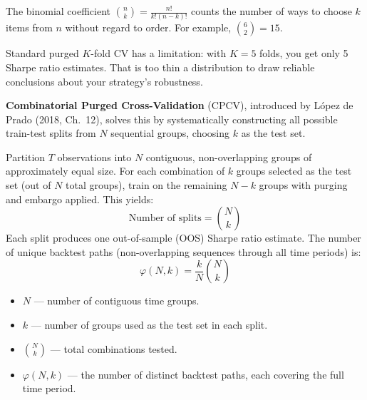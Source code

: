 \begin{prereq}
The binomial coefficient $\binom{n}{k} = \frac{n!}{k!(n-k)!}$ counts the number of ways to choose $k$ items from $n$ without regard to order. For example, $\binom{6}{2} = 15$.
\end{prereq}

Standard purged $K$-fold CV has a limitation: with $K = 5$ folds, you get only 5 Sharpe ratio estimates. That is too thin a distribution to draw reliable conclusions about your strategy's robustness.

\textbf{Combinatorial Purged Cross-Validation} (CPCV), introduced by L\'{o}pez de Prado (2018, Ch.~12), solves this by systematically constructing all possible train-test splits from $N$ sequential groups, choosing $k$ as the test set.

\begin{definition}[CPCV]
Partition $T$ observations into $N$ contiguous, non-overlapping groups of approximately equal size. For each combination of $k$ groups selected as the test set (out of $N$ total groups), train on the remaining $N - k$ groups with purging and embargo applied. This yields:
\begin{equation}
\text{Number of splits} = \binom{N}{k}
\label{eq:cpcv-splits}
\end{equation}
Each split produces one out-of-sample (OOS) Sharpe ratio estimate. The number of unique backtest paths (non-overlapping sequences through all time periods) is:
\begin{equation}
\varphi(N, k) = \frac{k}{N} \binom{N}{k}
\label{eq:cpcv-paths}
\end{equation}
\begin{itemize}[nosep]
  \item $N$ --- number of contiguous time groups.
  \item $k$ --- number of groups used as the test set in each split.
  \item $\binom{N}{k}$ --- total combinations tested.
  \item $\varphi(N, k)$ --- the number of distinct backtest paths, each covering the full time period.
\end{itemize}
\end{definition}

